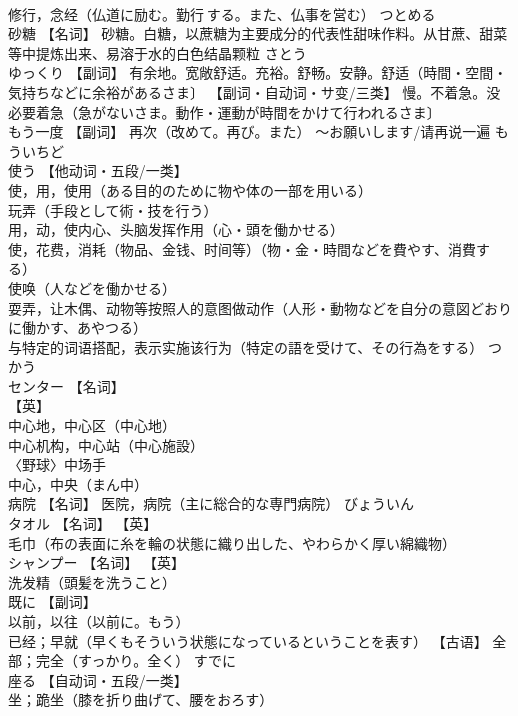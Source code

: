 \documentclass[8pt]{extreport}
\begin{document}
\begin{CJK}{UTF8}{min}
\\	修行，念经（仏道に励む。勤行 する。また、仏事を営む）	つとめる	
\\	砂糖	【名词】 砂糖。白糖，以蔗糖为主要成分的代表性甜味作料。从甘蔗、甜菜等中提炼出来、易溶于水的白色结晶颗粒	さとう	
\\	ゆっくり	【副词】 有余地。宽敞舒适。充裕。舒畅。安静。舒适（時間・空間・気持ちなどに余裕があるさま〕 【副词・自动词・サ变/三类】 慢。不着急。没必要着急（急がないさま。動作・運動が時間をかけて行われるさま〕		
\\	もう一度	【副词】 再次（改めて。再び。また） ～お願いします/请再说一遍	もういちど	
\\	使う	【他动词・五段/一类】 
\\	使，用，使用（ある目的のために物や体の一部を用いる） 
\\	玩弄（手段として術・技を行う） 
\\	用，动，使内心、头脑发挥作用（心・頭を働かせる） 
\\	使，花费，消耗（物品、金钱、时间等）（物・金・時間などを費やす、消費する） 
\\	使唤（人などを働かせる） 
\\	耍弄，让木偶、动物等按照人的意图做动作（人形・動物などを自分の意図どおりに働かす、あやつる） 
\\	与特定的词语搭配，表示实施该行为（特定の語を受けて、その行為をする）	つかう	
\\	センター	【名词】 
\\	【英】
\\	中心地，中心区（中心地） 
\\	中心机构，中心站（中心施設） 
\\	〈野球〉中场手 
\\	中心，中央（まん中）		
\\	病院	【名词】 医院，病院（主に総合的な専門病院）	びょういん	
\\	タオル	【名词】 【英】
\\	毛巾（布の表面に糸を輪の状態に織り出した、やわらかく厚い綿織物）		
\\	シャンプー	【名词】 【英】
\\	洗发精（頭髪を洗うこと）		
\\	既に	【副词】 
\\	以前，以往（以前に。もう） 
\\	已经；早就（早くもそういう状態になっているということを表す） 【古语】 全部；完全（すっかり。全く）	すでに	
\\	座る	【自动词・五段/一类】 
\\	坐；跪坐（膝を折り曲げて、腰をおろす） 

\end{CJK}
\end{document}
